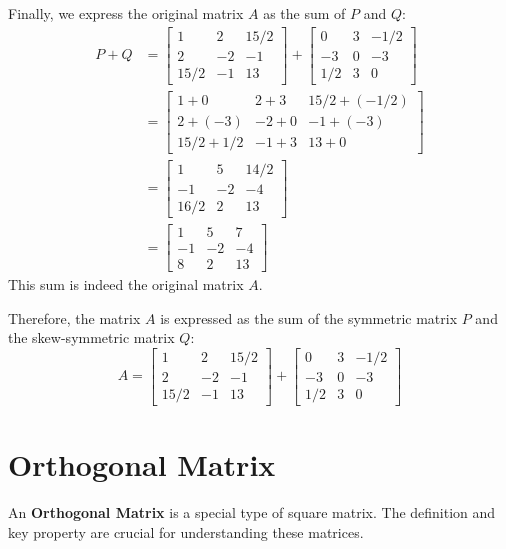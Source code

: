 \documentclass{article}
\begin{document}
Finally, we express the original matrix $A$ as the sum of $P$ and $Q$:
\begin{align*} P + Q &= \begin{bmatrix} 1 & 2 & 15/2 \\ 2 & -2 & -1 \\ 15/2 & -1 & 13 \end{bmatrix} + \begin{bmatrix} 0 & 3 & -1/2 \\ -3 & 0 & -3 \\ 1/2 & 3 & 0 \end{bmatrix} \\ &= \begin{bmatrix} 1+0 & 2+3 & 15/2+(-1/2) \\ 2+(-3) & -2+0 & -1+(-3) \\ 15/2+1/2 & -1+3 & 13+0 \end{bmatrix} \\ &= \begin{bmatrix} 1 & 5 & 14/2 \\ -1 & -2 & -4 \\ 16/2 & 2 & 13 \end{bmatrix} \\ &= \begin{bmatrix} 1 & 5 & 7 \\ -1 & -2 & -4 \\ 8 & 2 & 13 \end{bmatrix} \end{align*}
This sum is indeed the original matrix $A$.

Therefore, the matrix $A$ is expressed as the sum of the symmetric matrix $P$ and the skew-symmetric matrix $Q$:
\[ A = \begin{bmatrix} 1 & 2 & 15/2 \\ 2 & -2 & -1 \\ 15/2 & -1 & 13 \end{bmatrix} + \begin{bmatrix} 0 & 3 & -1/2 \\ -3 & 0 & -3 \\ 1/2 & 3 & 0 \end{bmatrix} \]

\section{Orthogonal Matrix} %

An \textbf{Orthogonal Matrix} is a special type of square matrix. The definition and key property are crucial for understanding these matrices.
\end{document}
